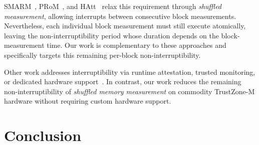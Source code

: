 \documentclass[conference]{IEEEtran}
\newcommand{\smarmcopy}{SMARM-Snap\xspace}
\newcommand{\smarmlock}{SMARM-Guard\xspace}
\begin{document}
SMARM~\cite{carpent2018smarm}, PRoM~\cite{aman2021prom}, and HAtt~\cite{aman2018hatt} relax this requirement through \emph{shuffled measurement}, allowing interrupts between consecutive block measurements. Nevertheless, each individual block measurement must still execute atomically, leaving the non-interruptibility period whose duration depends on the block-measurement time.
Our work is complementary to these approaches and specifically targets this remaining per-block non-interruptibility.

Other work addresses interruptibility via runtime attestation, trusted monitoring, or dedicated hardware support~\cite{isc-flat,asap,ida2024,lo-fat,litehax,atrium}.
In contrast, our work reduces the remaining non-interruptibility of \emph{shuffled memory measurement} on commodity TrustZone-M hardware without requiring custom hardware support.





\section{Conclusion}
\label{sec:conclusion}
\end{document}

